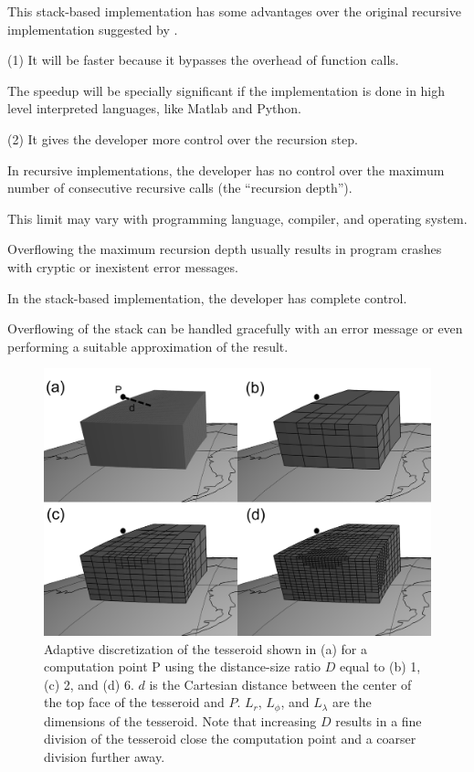 \documentclass[paper,twocolumn]{geophysics}
\begin{document}
This stack-based implementation has some advantages over the original recursive
implementation suggested by \citet{Li2011}.

(1) It will be faster because it bypasses the overhead of function calls.

The speedup will be specially significant if the implementation is done
in high level interpreted languages, like Matlab and Python.

(2) It gives the developer more control over the recursion step.

In recursive implementations,
the developer has no control over the maximum number of consecutive
recursive calls (the ``recursion depth'').

This limit may vary with programming language, compiler, and operating system.

Overflowing the maximum recursion depth usually results in program
crashes with cryptic or inexistent error messages.

In the stack-based implementation, the developer has complete control.

Overflowing of the stack can be handled gracefully with an error message or
even performing a suitable approximation of the result.

\begin{figure}
    \centering
    \includegraphics{figs/tesseroid-split}
    \caption{
        Adaptive discretization
        of the tesseroid shown in (a)
        for a computation point P
        using the distance-size ratio $D$ equal to
        (b) 1, (c) 2, and (d) 6.
        $d$ is the Cartesian distance between
        the center of the top face of the tesseroid
        and $P$.
        $L_r$, $L_\phi$, and $L_\lambda$ are the dimensions of the tesseroid.
        Note that increasing $D$
        results in a fine division of the tesseroid
        close the computation point
        and a coarser division further away.
    }
    \label{fig:division}
\end{figure}
\end{document}
